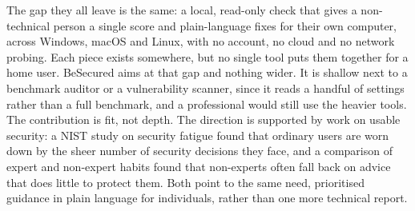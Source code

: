 \documentclass[11pt,a4paper]{article}
\begin{document}
The gap they all leave is the same: a local, read-only check that gives a
non-technical person a single score and plain-language fixes for their own
computer, across Windows, macOS and Linux, with no account, no cloud and no
network probing. Each piece exists somewhere, but no single tool puts them
together for a home user. BeSecured aims at that gap and nothing wider. It is
shallow next to a benchmark auditor or a vulnerability scanner, since it reads a
handful of settings rather than a full benchmark, and a professional would still
use the heavier tools. The contribution is fit, not depth. The direction is
supported by work on usable security: a NIST study on security fatigue found that
ordinary users are worn down by the sheer number of security decisions they face,
and a comparison of expert and non-expert habits found that non-experts often
fall back on advice that does little to protect them. Both point to the same need,
prioritised guidance in plain language for individuals, rather than one more
technical report.
\end{document}
